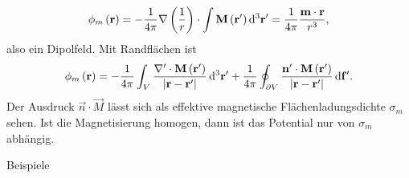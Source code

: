 \begin{itemize}
\begin{equation*}
		      \phi _{m}\left(\mathbf{r}\right)=-\frac{1}{4\pi }\nabla \left(\frac{1}{r}\right)\cdot \int \mathbf{M}\left(\mathbf{r}'\right)\mathop{}\!\mathrm{d} ^{3}\mathbf{r}'=\frac{1}{4\pi }\frac{\mathbf{m}\cdot \mathbf{r}}{r^{3}},
	      \end{equation*}
	      also ein Dipolfeld. Mit Randflächen ist
	      \begin{equation*}
		      \phi _{m}\left(\mathbf{r}\right)=-\frac{1}{4\pi }\int _{V}\frac{\nabla '\cdot \mathbf{M}\left(\mathbf{r}'\right)}{\left| \mathbf{r}-\mathbf{r}'\right| }\mathop{}\!\mathrm{d} ^{3}\mathbf{r}'+\frac{1}{4\pi }\oint _{\partial V}\frac{\mathbf{n}'\cdot \mathbf{M}\left(\mathbf{r}'\right)}{\left| \mathbf{r}-\mathbf{r}'\right| }\mathop{}\!\mathrm{d} \mathbf{f}'.
	      \end{equation*}
	      Der Ausdruck $\vec {n}\cdot \vec {M}$ lässt sich als effektive magnetische Flächenladungsdichte $\sigma _{m}$ sehen. Ist die Magnetisierung homogen, dann ist das Potential nur von $\sigma _{m}$ abhängig.
\end{itemize}
Beispiele

